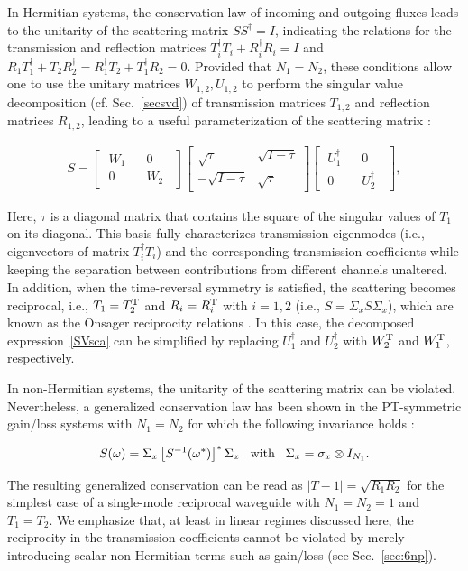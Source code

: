 \documentclass{tADP2e}
\theoremstyle{plain}
\newcommand{\eqn}[1]{
\begin{eqnarray}
	#1
\end{eqnarray}
}
\theoremstyle{plain}
\theoremstyle{definition}
\begin{document}
In Hermitian systems, the conservation law of incoming and outgoing fluxes leads to the unitarity of the scattering matrix $SS^\dagger=I$, indicating the relations for the transmission and reflection matrices $T_i^\dagger T_i+R_i^\dagger R_i=I$ and $R_1T_1^\dagger+T_2R_2^\dagger=R_1^\dagger T_2+T_1^\dagger R_2=0$. Provided that $N_1=N_2$, these conditions allow one to use the unitary matrices $W_{1,2},U_{1,2}$ to perform the singular value decomposition (cf. Sec.~\ref{secsvd}) of transmission matrices $T_{1,2}$ and reflection matrices $R_{1,2}$, leading to a useful parameterization of the scattering matrix \cite{PAM88,MTh92}:
\eqn{\label{SVsca}
S=
\begin{bmatrix}
\;W_1\;&\;\;0\;\;\\
\;0\;&\;\;W_2\;\;
\end{bmatrix}
\begin{bmatrix}
\sqrt{\tau}&\sqrt{I-\tau}\\
-\sqrt{I-\tau}&\sqrt{\tau}
\end{bmatrix}
\begin{bmatrix}
\;U_1^\dagger\;&\;\;0\;\;\\
\;0\;&\;\;U_2^\dagger\;\;
\end{bmatrix},
}
Here, $\tau$ is a diagonal matrix that contains the square of the singular values of $T_1$ on its diagonal. This basis fully characterizes transmission eigenmodes (i.e., eigenvectors of matrix $T_i^\dagger T_i$) and the corresponding transmission coefficients while keeping the separation between contributions from different channels unaltered. In addition, when the time-reversal symmetry is satisfied, the scattering becomes reciprocal, i.e.,  $T_1=T_2^{\rm T}$ and $R_i=R_i^{\rm T}$ with $i=1,2$ (i.e., $S=\Sigma_xS\Sigma_x$), which are known as the Onsager reciprocity relations \cite{OL31}. In this case, the decomposed expression~\eqref{SVsca} can be simplified by replacing  $U_{1}^\dagger$ and $U_{2}^\dagger$ with $W_{2}^{\rm T}$ and $W_{1}^{\rm T}$, respectively.

In non-Hermitian systems, the unitarity of the scattering matrix can be violated. Nevertheless, a generalized %
conservation law has been shown in the PT-symmetric gain/loss systems with $N_1=N_2$ for which the following invariance holds \cite{GL12,GL15}:
\eqn{
S(\omega)=\Sigma_x\left[S^{-1}(\omega^{*})\right]^*\Sigma_x\;\;\;{\rm with}\;\;\; \Sigma_x=\sigma_x\otimes I_{N_1}. 
}
The resulting generalized conservation can be read as $|T-1|=\sqrt{R_1R_2}$ for the simplest case of a single-mode reciprocal waveguide with $N_1=N_2=1$ and $T_1=T_2$. We emphasize that, at least in linear regimes discussed here, the reciprocity in the transmission coefficients cannot be violated by merely introducing scalar non-Hermitian terms such as gain/loss  (see Sec.~\ref{sec:6np}). 
\end{document}
